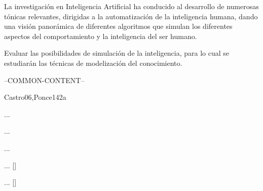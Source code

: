 \begin{syllabus}

	
	\begin{justification}
	La investigación en Inteligencia Artificial ha conducido al desarrollo de
	numerosas tónicas relevantes, dirigidas a la automatización de la
	inteligencia humana, dando una visión panorámica de diferentes
	algoritmos que simulan los diferentes aspectos del comportamiento
	y la inteligencia del ser humano.
	\end{justification}
	
	\begin{goals}
			\item Evaluar las posibilidades de simulación de la inteligencia, para lo cual se estudiarán las técnicas de modelización del conocimiento.
	\end{goals}
	
	--COMMON-CONTENT--
	
	\begin{unit}{\ISFundamentalIssues}{}{Castro06,Ponce14}{2}{a}
			\begin{topics}
					\item ...
					\item ...
					\item ...
			\end{topics}
			\begin{learningoutcomes}
					\item ... [\Usage]
					\item ... [\Usage]
			\end{learningoutcomes}
	\end{unit}

	
	\begin{coursebibliography}
	\end{coursebibliography}
	
	\end{syllabus}
	